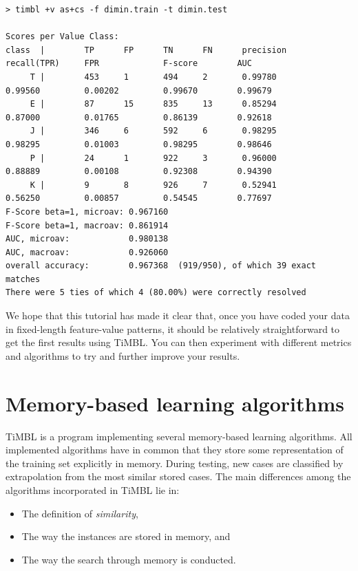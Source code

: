 \documentclass{book}
\begin{document}
{\footnotesize
\begin{verbatim}
> timbl +v as+cs -f dimin.train -t dimin.test

Scores per Value Class:
class  |        TP      FP      TN      FN      precision       recall(TPR)     FPR             F-score        AUC
     T |        453     1       494     2       0.99780         0.99560         0.00202         0.99670        0.99679
     E |        87      15      835     13      0.85294         0.87000         0.01765         0.86139        0.92618
     J |        346     6       592     6       0.98295         0.98295         0.01003         0.98295        0.98646
     P |        24      1       922     3       0.96000         0.88889         0.00108         0.92308        0.94390
     K |        9       8       926     7       0.52941         0.56250         0.00857         0.54545        0.77697
F-Score beta=1, microav: 0.967160
F-Score beta=1, macroav: 0.861914
AUC, microav:            0.980138
AUC, macroav:            0.926060
overall accuracy:        0.967368  (919/950), of which 39 exact matches
There were 5 ties of which 4 (80.00%) were correctly resolved
\end{verbatim}
}

We hope that this tutorial has made it clear that, once you have coded
your data in fixed-length feature-value patterns, it should be
relatively straightforward to get the first results using TiMBL. You
can then experiment with different metrics and algorithms to try and
further improve your results.

\chapter{Memory-based learning algorithms}
\label{algorithms}

TiMBL is a program implementing several memory-based learning
algorithms. All implemented algorithms have in common that they store some
representation of the training set explicitly in memory. During
testing, new cases are classified by extrapolation from the most
similar stored cases. The main differences among the algorithms
incorporated in TiMBL lie in:

\begin{itemize}
\item The definition of {\em similarity},
\item The way the instances are stored in memory, and
\item The way the search through memory is conducted.
\end{itemize}
\end{document}

